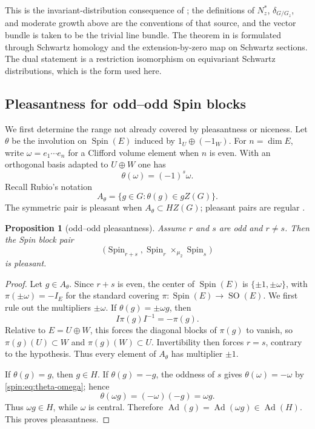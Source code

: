 \documentclass[11pt,reqno]{amsart}
\numberwithin{equation}{section}
\newtheorem{proposition}[theorem]{Proposition}
\theoremstyle{definition}
\theoremstyle{remark}
\newcommand{\Spin}{\operatorname{Spin}}
\newcommand{\SO}{\operatorname{SO}}
\newcommand{\Ad}{\operatorname{Ad}}
\begin{document}
This is the invariant-distribution consequence of
\cite[Theorems~1.12--1.13]{ChenSun}; the definitions of $N_z^*$,
$\delta_{G/G_z}$, and moderate growth above are the conventions of that
source, and the vector bundle is taken to be the trivial line bundle.  The theorem in \cite{ChenSun} is formulated through
Schwartz homology and the extension-by-zero map on Schwartz sections.  The
dual statement is a restriction isomorphism on equivariant Schwartz
distributions, which is the form used here.

\subsection{Pleasantness for odd--odd Spin blocks}\label{spin:sec:indexing}

We first determine the range not already covered by pleasantness or niceness.  Let $\theta$ be the involution on $\Spin(E)$ induced by
$1_U\oplus(-1_W)$.  For $n=\dim E$, write $\omega=e_1\cdots e_n$ for a
Clifford volume element when $n$ is even.  With an orthogonal basis adapted to
$U\oplus W$ one has
\begin{equation}\label{spin:eq:theta-omega}
  \theta(\omega)=(-1)^s\omega.
\end{equation}
Recall Rubio's notation
\[
  A_\theta=\{g\in G:\theta(g)\in gZ(G)\}.
\]
The symmetric pair is pleasant when $A_\theta\subset HZ(G)$; pleasant pairs
are regular \cite[Lemma~4.2]{Rubio}.

\begin{proposition}[odd--odd pleasantness]\label{spin:prop:pleasant}
Assume $r$ and $s$ are odd and $r\ne s$.  Then the Spin block pair
\[
  \bigl(\Spin_{r+s},\Spin_r\times_{\mu_2}\Spin_s\bigr)
\]
is pleasant.
\end{proposition}

\begin{proof}
Let $g\in A_\theta$.  Since $r+s$ is even, the center of $\Spin(E)$ is
$\{\pm1,\pm\omega\}$, with $\pi(\pm\omega)=-I_E$ for the standard covering
$\pi:\Spin(E)\to\SO(E)$.  We first rule out the multipliers $\pm\omega$.
If $\theta(g)=\pm\omega g$, then
\[
  I\pi(g)I^{-1}=-\pi(g).
\]
Relative to $E=U\oplus W$, this forces the diagonal blocks of $\pi(g)$ to
vanish, so $\pi(g)(U)\subset W$ and $\pi(g)(W)\subset U$.  Invertibility
then forces $r=s$, contrary to the hypothesis.  Thus every element of
$A_\theta$ has multiplier $\pm1$.

If $\theta(g)=g$, then $g\in H$.  If $\theta(g)=-g$, the oddness of $s$
gives $\theta(\omega)=-\omega$ by \eqref{spin:eq:theta-omega}; hence
\[
  \theta(\omega g)=(-\omega)(-g)=\omega g.
\]
Thus $\omega g\in H$, while $\omega$ is central.  Therefore
$\Ad(g)=\Ad(\omega g)\in\Ad(H)$.  This proves pleasantness.
\end{proof}
\end{document}
